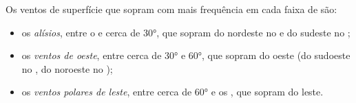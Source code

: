 \begin{definition}\label{def:g8:winds-global-circulation:global-winds}
Os ventos de superfície que sopram com mais frequência em cada faixa de  são:
\begin{itemize}
  \item os \emph{alísios}, entre o  e cerca
        de \ang{30}, que sopram do nordeste no  e do
        sudeste no ;
  \item os \emph{ventos de oeste}, entre cerca de
        \ang{30} e \ang{60}, que sopram do oeste (do sudoeste no
        , do noroeste no );
  \item os \emph{ventos polares de leste}, entre cerca de
        \ang{60} e os , que sopram do leste.
\end{itemize}
\end{definition}

